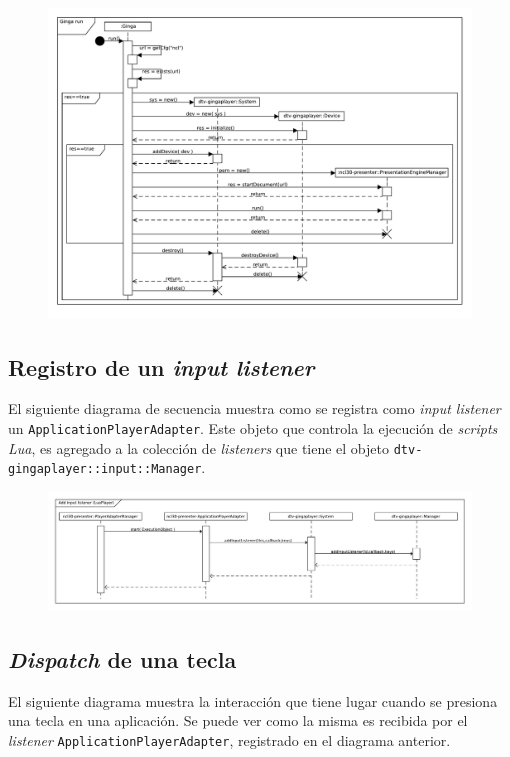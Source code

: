 \begin{figure}[ht!]
\centering
\includegraphics[scale=.5, angle=-90]{../resources/uml-sequence-diagram-ginga-run}
\end{figure}
\clearpage

\subsection{Registro de un \textit{input listener}}
El siguiente diagrama de secuencia muestra como se registra como \textit{input listener} un \texttt{ApplicationPlayerAdapter}.
Este objeto que controla la ejecución de \textit{scripts} \textit{Lua}, es agregado a la colección de \textit{listeners} que 
tiene el objeto \texttt{dtv-gingaplayer::input::Manager}. 

\begin{figure}[ht!]
\centering
\includegraphics[scale=.4, angle=-90]{../resources/uml-sequence-diagram-keyPress1}
\end{figure}
\clearpage
 
\subsection{\textit{Dispatch} de una tecla}
El siguiente diagrama muestra la interacción que tiene lugar cuando se presiona una tecla en una aplicación.
Se puede ver como la misma es recibida por el \textit{listener} \texttt{ApplicationPlayerAdapter}, registrado en el diagrama anterior.

